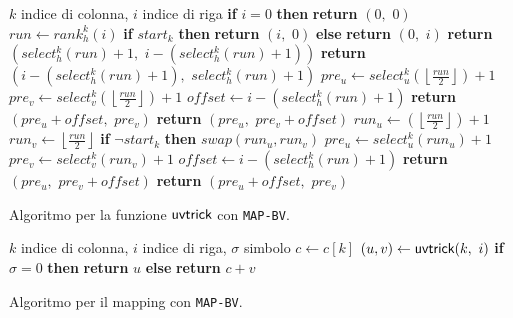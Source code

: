 \begin{algorithm}
  \begin{algorithmic}[1]
    \Comment $k$ indice di colonna, $i$ indice di riga
    \State \textbf{if} $i=0$ \textbf{then}  \textbf{return} $(0,\,\,0)$
    \State $run \gets rank_h^{k}(i)$
    \State \textbf{if} $start_k$ \textbf{then} \textbf{return} $(i,\,\, 0)$
    \textbf{else} \textbf{return} $(0, \,\,i)$
    \State \textbf{return} $(select_h^{k}(run)+1,\,\, i-(select_h^{k}(run)+1))$
    \Else
    \State \textbf{return} $(i-(select_h^{k}(run)+1),\,\, select_h^{k}(run)+1)$
    \EndIf
    \Else
    \State $pre_u\gets
    select_u^{k}\left(\left\lfloor\frac{run}{2}\right\rfloor\right)+1$ 
    \State $pre_v\gets
    select_v^{k}\left(\left\lfloor\frac{run}{2}\right\rfloor\right)+1$ 
    \State $offset \gets i -(select_h^{k}(run)+1)$
    \State \textbf{return} $(pre_u+offset,\,\, pre_v)$
    \Else
    \State \textbf{return} $(pre_u, \,\,pre_v+offset)$
    \EndIf
    \Else
    \State $run_u\gets \left(\left\lfloor\frac{run}{2}\right\rfloor\right)+1$
    \State $run_v\gets \left\lfloor\frac{run}{2}\right\rfloor$
    \State \textbf{if} $\neg start_k$ \textbf{then} $swap(run_u, run_v)$
    \State $pre_u\gets select_u^{k}(run_u)+1$
    \State $pre_v\gets select_v^{k}(run_v)+1$
    \State $offset \gets i -(select_h^{k}(run)+1)$
    \State \textbf{return} $(pre_u, \,\,pre_v+offset)$
    \Else
    \State \textbf{return} $(pre_u+offset, \,\,pre_v)$
    \EndIf
    \EndIf
    \EndIf
    \EndFunction
  \end{algorithmic}
  \caption{Algoritmo per la funzione $\mbox{\rm {\sf uvtrick}}$ con \texttt{MAP-BV}.}
  \label{algo:uvbv}
\end{algorithm}
\begin{algorithm}
  \begin{algorithmic}[1]
    \Comment $k$ indice di colonna, $i$ indice di riga, $\sigma$ simbolo
    \State $c\gets c[k]$
    \State $(u, v) \gets \mbox{\rm {\sf uvtrick}}(k,\,\,i)$
    \State \textbf{if} $\sigma = 0$ \textbf{then} \textbf{return} $u$
    \textbf{else}  \textbf{return} $c+v$
    \EndFunction
  \end{algorithmic}
  \caption{Algoritmo per il mapping con \texttt{MAP-BV}.}
  \label{algo:lfr}
\end{algorithm}
